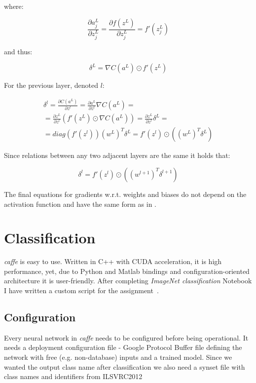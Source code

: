 \documentclass[journal, a4paper]{IEEEtran}
\begin{document}
    where:
    
    \begin{equation}
      \frac{\partial a_j^L}{\partial z_j^L} = \frac{\partial f(z^L)}{\partial z_j^L} = f'(z_j^L)
    \end{equation}
    
    and thus:
    
    \begin{equation}
      \delta^L = \nabla C(a^L) \odot f'(z^L)
    \end{equation}
    
    For the previous layer, denoted $l$:
    
    \begin{equation}
    \begin{gathered}
      \delta^l = \frac{\partial C(a^L)}{\partial z^l} = \frac{\partial a^L}{\partial z^l} \nabla C(a^L) = \\ = \frac{\partial z^L}{\partial z^l} (f'(z^L) \odot \nabla C(a^L) ) = \frac{\partial z^L}{\partial z^l} \delta^L = \\ = diag(f'(z^l))(w^L)^T \delta^L = f'(z^l) \odot ((w^L)^T \delta^L)
    \end{gathered}
    \end{equation}
    
    Since relations between any two adjacent layers are the same it holds that:
    
    \begin{equation}
      \delta^l  = f'(z^l) \odot ((w^{l+1})^T \delta^{l+1})
    \end{equation}
    
    The final equations for gradients w.r.t. weights and biases do not depend on the activation function and have the same form as in \cite{MLDL}.    
    		
\section {Classification}
  \textit{caffe} is easy to use. Written in C++ with CUDA acceleration, it is high performance, yet, due to Python and Matlab bindings and configuration-oriented architecture it is user-friendly. After completing \textit{ImageNet classification} Notebook I have written a custom script for the assignment~\cite{code}.
  
  \subsection{Configuration}
    Every neural network in \textit{caffe} needs to be configured before being operational. It needs a deployment configuration file - Google Protocol Buffer file defining the network with free (e.g. non-database) inputs and a trained model. Since we wanted the output class name after classification we also need a synset file with class names and identifiers from ILSVRC2012 \cite{ImageNet}
   
\end{document}
